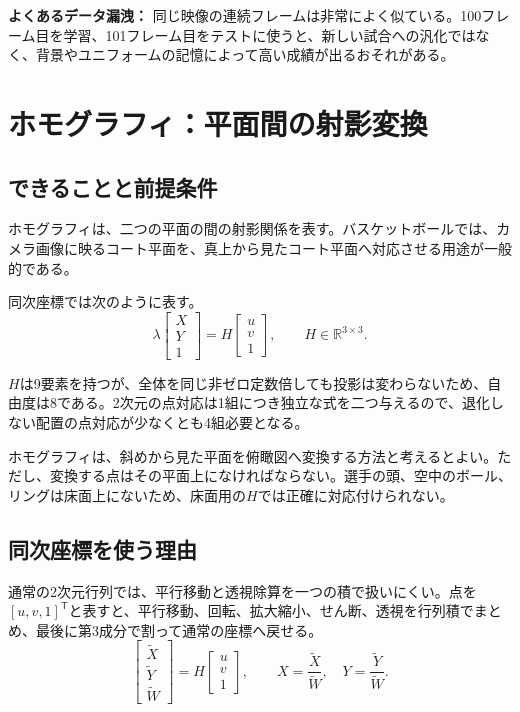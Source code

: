 \documentclass[11pt,a4paper,oneside]{report}
\begin{document}
\begin{riskBox}
\textbf{よくあるデータ漏洩：}\quad
同じ映像の連続フレームは非常によく似ている。100フレーム目を学習、101フレーム目をテストに使うと、新しい試合への汎化ではなく、背景やユニフォームの記憶によって高い成績が出るおそれがある。
\end{riskBox}

\clearpage
\section{ホモグラフィ：平面間の射影変換}

\subsection{できることと前提条件}

ホモグラフィは、二つの平面の間の射影関係を表す。バスケットボールでは、カメラ画像に映るコート平面を、真上から見たコート平面へ対応させる用途が一般的である。

同次座標では次のように表す。
\[
\lambda
\begin{bmatrix}X\\Y\\1\end{bmatrix}
=
H
\begin{bmatrix}u\\v\\1\end{bmatrix},
\qquad
H\in\mathbb{R}^{3\times 3}.
\]

$H$は9要素を持つが、全体を同じ非ゼロ定数倍しても投影は変わらないため、自由度は8である。2次元の点対応は1組につき独立な式を二つ与えるので、退化しない配置の点対応が少なくとも4組必要となる。

\begin{conceptBox}
ホモグラフィは、斜めから見た平面を俯瞰図へ変換する方法と考えるとよい。ただし、変換する点はその平面上になければならない。選手の頭、空中のボール、リングは床面上にないため、床面用の$H$では正確に対応付けられない。
\end{conceptBox}

\subsection{同次座標を使う理由}

通常の2次元行列では、平行移動と透視除算を一つの積で扱いにくい。点を$[u,v,1]^\mathsf{T}$と表すと、平行移動、回転、拡大縮小、せん断、透視を行列積でまとめ、最後に第3成分で割って通常の座標へ戻せる。
\[
\begin{bmatrix}\tilde X\\\tilde Y\\\tilde W\end{bmatrix}
=H\begin{bmatrix}u\\v\\1\end{bmatrix},
\qquad
X=\frac{\tilde X}{\tilde W},\quad
Y=\frac{\tilde Y}{\tilde W}.
\]
\end{document}
